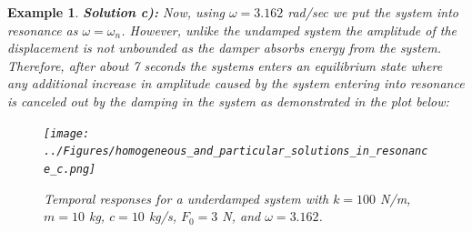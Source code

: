 \documentclass[12pt,letter]{article}
\newtheorem{ex}{Example}
\numberwithin{ex}{section} %
\newenvironment{example}{\begin{mdframed}[middlelinewidth=0.5mm]\begin{ex}\normalfont}{\end{ex}\end{mdframed}}
\numberwithin{re}{section} %
\begin{document}
\begin{example}
				\noindent\textbf{Solution c):} Now, using $\omega=3.162$ rad/sec we put the system into resonance as $\omega=\omega_n$. However, unlike the undamped system  the amplitude of the displacement is not unbounded as the damper absorbs energy from the system. Therefore, after about 7 seconds the systems enters an equilibrium state where any additional increase in amplitude caused by the system entering into resonance is canceled out by the damping in the system as demonstrated in the plot below:
				\begin{figure}[H]
					\centering
					\texttt{[image: ../Figures/homogeneous\_and\_particular\_solutions\_in\_resonance\_c.png]}
					\caption{Temporal responses for a underdamped system with $k=100$ N/m, $m=10$ kg,  $c=10$ kg/s, $F_0=3$ N, and $\omega = 3.162$.}
				\end{figure}				
			\end{example}	
\end{document}
